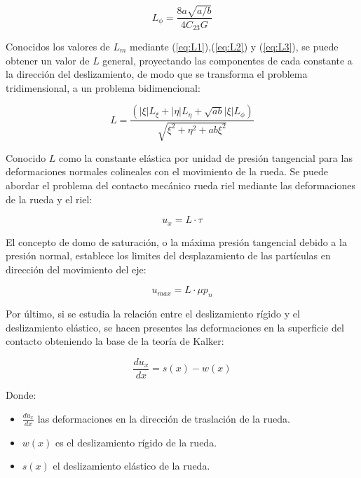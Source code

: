 \documentclass[main]{subfiles}
\begin{document}
\begin{equation}
\label{eq:L3}
L_\phi=\frac{8a\sqrt{a/b}}{4C_{23}G}
\end{equation}

Conocidos los valores de $L_m$ mediante (\ref{eq:L1}),(\ref{eq:L2}) y (\ref{eq:L3}), se puede obtener un valor de $L$ general, proyectando las componentes de cada constante a la dirección del deslizamiento, de modo que se transforma el problema tridimensional, a un problema bidimencional:

\begin{equation}
\label{eq:Lgen}
L=\frac{
\left(
|\xi |L_\xi + |\eta |L_\eta + \sqrt{ab}|\xi |L_\phi
\right)
}
{
\sqrt{
\xi ^2+\eta ^2+ ab \xi^2
}
}
\end{equation}

Conocido $L$ como la constante elástica por unidad de presión tangencial para las deformaciones normales colineales con el movimiento de la rueda. Se puede abordar el problema del contacto mecánico rueda riel mediante las deformaciones de la rueda y el riel:

\begin{equation}
\label{eq=Defor}
u_x=L\cdot \tau
\end{equation}

El concepto de domo de saturación, o la máxima presión tangencial debido a la presión normal, establece los limites del desplazamiento de las partículas en dirección del movimiento del eje:

\begin{equation}
\label{eq=DeforMax}
u_{max}=L\cdot \mu p_n
\end{equation}

Por último, si se estudia la relación entre el deslizamiento rígido y el deslizamiento elástico, se hacen presentes las deformaciones en la superficie del contacto obteniendo la base de la teoría de Kalker:

\begin{equation}
\label{DifSol}
\frac{du_x}{dx}=s(x)-w(x)
\end{equation}

\par \hspace{1cm}
\begin{minipage}{10cm}
\begin{spacing}{0.5}
Donde:
\begin{itemize}
\item $\frac{du_x}{dx}$ las deformaciones en la dirección de traslación de la rueda.
\item $w(x)$ es el deslizamiento rígido de la rueda.
\item $s(x)$ el deslizamiento elástico de la rueda.
\end{itemize}
\end{spacing}
\end{minipage}
\end{document}
